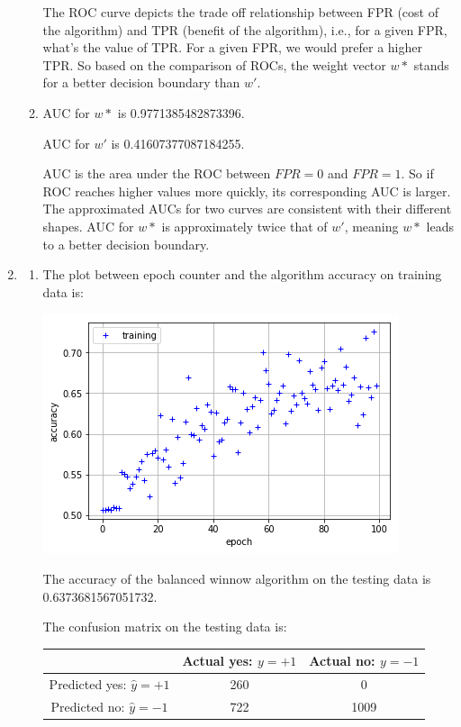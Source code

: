 \documentclass[paper=letter, fontsize=12pt]{article}
\begin{document}
\begin{enumerate}
\begin{enumerate}
	The ROC curve depicts the trade off relationship between FPR (cost of the algorithm) and TPR (benefit of the algorithm), i.e., for a given FPR, what's the value of TPR. For a given FPR, we would prefer a higher TPR. So based on the comparison of ROCs, the weight vector $w*$ stands for a better decision boundary than $w'$.
	
	\item
	AUC for $w*$ is 0.9771385482873396.
	 
	AUC for $w'$ is 0.41607377087184255.
	
	AUC is the area under the ROC between $FPR = 0$ and $FPR = 1$. So if ROC reaches higher values more quickly, its corresponding AUC is larger. The approximated AUCs for two curves are consistent with their different shapes. AUC for $w*$ is approximately twice that of $w'$, meaning $w*$ leads to a better decision boundary.
	 
\end{enumerate}

\item 
\begin{enumerate}
	\item 
	The plot between epoch counter and the algorithm accuracy on training data is:
	
	\includegraphics[scale=0.5]{p2q2a.png}
	
	The accuracy of the balanced winnow algorithm on the testing data is 0.6373681567051732.
	
	The confusion matrix on the testing data is:
	
	\begin{tabular} {|c|c|c|}
		\hline
		& Actual yes: $y = +1$ & Actual no: $y = -1$	\\ \hline
		Predicted yes: $\hat{y} = +1$& 260 & 0 \\ \hline
		Predicted no: $\hat{y} = -1$ & 722 & 1009 \\ \hline
	\end{tabular}


\end{enumerate}
\end{enumerate}
\end{document}
